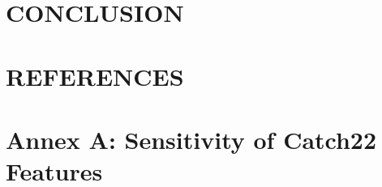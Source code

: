 \documentclass{article}
\begin{document}
\hypertarget{conclusion}{%
\section{CONCLUSION}\label{conclusion}}

\label{sec:headings}

\hypertarget{references}{%
\section{REFERENCES}\label{references}}

\label{sec:headings}

\hypertarget{annex-a-sensitivity-of-catch22-features}{%
\section{Annex A: Sensitivity of Catch22
Features}\label{annex-a-sensitivity-of-catch22-features}}
\end{document}
